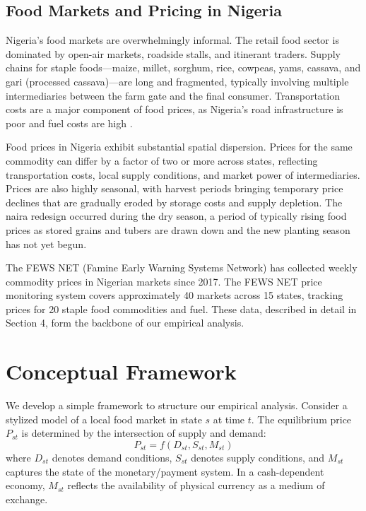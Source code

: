 \documentclass[12pt]{article}
\begin{document}
\subsection{Food Markets and Pricing in Nigeria}

Nigeria's food markets are overwhelmingly informal. The retail food sector is dominated by open-air markets, roadside stalls, and itinerant traders. Supply chains for staple foods---maize, millet, sorghum, rice, cowpeas, yams, cassava, and gari (processed cassava)---are long and fragmented, typically involving multiple intermediaries between the farm gate and the final consumer. Transportation costs are a major component of food prices, as Nigeria's road infrastructure is poor and fuel costs are high \citep{atkin2015trade}.

Food prices in Nigeria exhibit substantial spatial dispersion. Prices for the same commodity can differ by a factor of two or more across states, reflecting transportation costs, local supply conditions, and market power of intermediaries. Prices are also highly seasonal, with harvest periods bringing temporary price declines that are gradually eroded by storage costs and supply depletion. The naira redesign occurred during the dry season, a period of typically rising food prices as stored grains and tubers are drawn down and the new planting season has not yet begun.

The FEWS NET (Famine Early Warning Systems Network) has collected weekly commodity prices in Nigerian markets since 2017. The FEWS NET price monitoring system covers approximately 40 markets across 15 states, tracking prices for 20 staple food commodities and fuel. These data, described in detail in Section 4, form the backbone of our empirical analysis.


\section{Conceptual Framework}

We develop a simple framework to structure our empirical analysis. Consider a stylized model of a local food market in state $s$ at time $t$. The equilibrium price $P_{st}$ is determined by the intersection of supply and demand:
\begin{equation}
    P_{st} = f(D_{st}, S_{st}, M_{st})
\end{equation}
where $D_{st}$ denotes demand conditions, $S_{st}$ denotes supply conditions, and $M_{st}$ captures the state of the monetary/payment system. In a cash-dependent economy, $M_{st}$ reflects the availability of physical currency as a medium of exchange.
\end{document}
